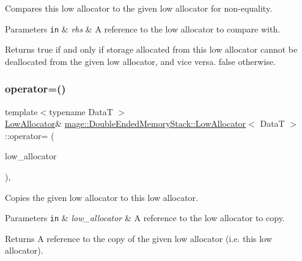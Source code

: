 Compares this low allocator to the given low allocator for non-\/equality.


\begin{DoxyParams}[1]{Parameters}
\mbox{\tt in}  & {\em rhs} & A reference to the low allocator to compare with. \\
\hline
\end{DoxyParams}
\begin{DoxyReturn}{Returns}
{\ttfamily true} if and only if storage allocated from this low allocator cannot be deallocated from the given low allocator, and vice versa. {\ttfamily false} otherwise. 
\end{DoxyReturn}
\hypertarget{structmage_1_1_double_ended_memory_stack_1_1_low_allocator_a23f8384b9edf1ccb30673d128889c47b}{}\label{structmage_1_1_double_ended_memory_stack_1_1_low_allocator_a23f8384b9edf1ccb30673d128889c47b} 
\subsubsection{\texorpdfstring{operator=()}{operator=()}\hspace{0.1cm}{\footnotesize\ttfamily [1/2]}}
{\footnotesize\ttfamily template$<$typename DataT $>$ \\
\hyperlink{structmage_1_1_double_ended_memory_stack_1_1_low_allocator}{Low\+Allocator}\& \hyperlink{structmage_1_1_double_ended_memory_stack_1_1_low_allocator}{mage\+::\+Double\+Ended\+Memory\+Stack\+::\+Low\+Allocator}$<$ DataT $>$\+::operator= (\begin{DoxyParamCaption}\item[{const \hyperlink{structmage_1_1_double_ended_memory_stack_1_1_low_allocator}{Low\+Allocator}$<$ DataT $>$ \&}]{low\+\_\+allocator }\end{DoxyParamCaption})\hspace{0.3cm}{\ttfamily [delete]}, {\ttfamily [noexcept]}}

Copies the given low allocator to this low allocator.


\begin{DoxyParams}[1]{Parameters}
\mbox{\tt in}  & {\em low\+\_\+allocator} & A reference to the low allocator to copy. \\
\hline
\end{DoxyParams}
\begin{DoxyReturn}{Returns}
A reference to the copy of the given low allocator (i.\+e. this low allocator). 
\end{DoxyReturn}
\hypertarget{structmage_1_1_double_ended_memory_stack_1_1_low_allocator_a7b567dbb4462d9a844154e4ed585f636}{}\label{structmage_1_1_double_ended_memory_stack_1_1_low_allocator_a7b567dbb4462d9a844154e4ed585f636} 
